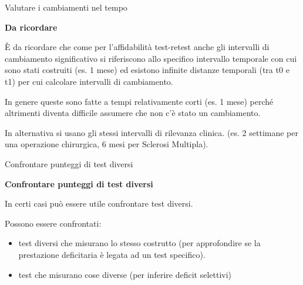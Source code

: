 \documentclass[
  ignorenonframetext,
  aspectratio=169,
]{beamer}
\begin{document}
\begin{frame}{Valutare i cambiamenti nel tempo}
\label{valutare-i-cambiamenti-nel-tempo-16}
\begin{center}
\textbf{Da ricordare}
\end{center}
\vspace{1em}

È da ricordare che come per l'affidabilità test-retest anche gli
intervalli di cambiamento significativo si riferiscono allo specifico
intervallo temporale con cui sono stati costruiti (es. 1 mese) ed
esistono infinite distanze temporali (tra t0 e t1) per cui calcolare
intervalli di cambiamento.

In genere queste sono fatte a tempi relativamente corti (es. 1 mese)
perché altrimenti diventa difficile assumere che non c'è stato un
cambiamento.

In alternativa si usano gli stessi intervalli di rilevanza clinica. (es.
2 settimane per una operazione chirurgica, 6 mesi per Sclerosi
Multipla).
\end{frame}

\begin{frame}{Confrontare punteggi di test diversi}
\label{confrontare-punteggi-di-test-diversi}
\begin{center}
  \textbf{Confrontare punteggi di test diversi}
\end{center}
\vspace{2em}

In certi casi può essere utile confrontare test diversi.

Possono essere confrontati:

\begin{itemize}
\item
  test diversi che misurano lo stesso costrutto (per approfondire se la
  prestazione deficitaria è legata ad un test specifico).
\item
  test che misurano cose diverse (per inferire deficit selettivi)
\end{itemize}
\end{frame}
\end{document}
